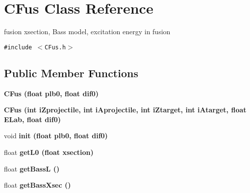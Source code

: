 \section{CFus Class Reference}
\label{classCFus}
fusion xsection, Bass model, excitation energy in fusion  


{\tt \#include $<$CFus.h$>$}

\subsection*{Public Member Functions}
\begin{CompactItemize}
\item 
\bf{CFus} (float plb0, float dif0)
\item 
\bf{CFus} (int i\-Zprojectile, int i\-Aprojectile, int i\-Ztarget, int i\-Atarget, float ELab, float dif0)
\item 
void \bf{init} (float plb0, float dif0)
\item 
float \bf{get\-L0} (float xsection)
\item 
float \bf{get\-Bass\-L} ()
\item 
float \bf{get\-Bass\-Xsec} ()
\end{CompactItemize}
